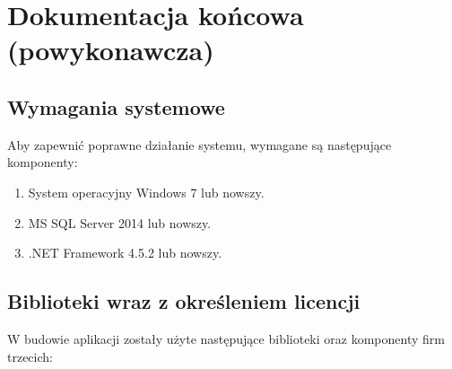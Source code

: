 \documentclass[10pt,a4paper]{article}
\begin{document}
\section{Dokumentacja końcowa (powykonawcza)}

\subsection{Wymagania systemowe}
Aby zapewnić poprawne działanie systemu, wymagane są następujące komponenty:
\begin{enumerate}
	\item System operacyjny Windows 7 lub nowszy.
	\item MS SQL Server 2014 lub nowszy.
	\item .NET Framework 4.5.2 lub nowszy.
\end{enumerate}
%

\subsection{Biblioteki wraz z określeniem licencji}
W budowie aplikacji zostały użyte następujące biblioteki oraz komponenty firm trzecich:
\end{document}
